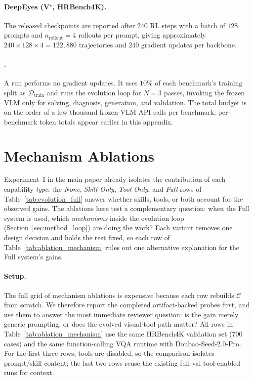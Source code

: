 \paragraph{DeepEyes (V$^\star$, HRBench4K).}
The released checkpoints are reported after $240$ RL steps with a batch of $128$ prompts
and $n_{\text{rollout}}{=}4$ rollouts per prompt, giving approximately
$240 \times 128 \times 4 = 122{,}880$ trajectories and $240$ gradient updates per backbone.

\paragraph{\sysname{}.}
A \sysname{} run performs no gradient updates. It uses $10\%$ of each benchmark's training
split as $\mathcal{D}_{\text{train}}$ and runs the evolution loop for $N{=}3$ passes,
invoking the frozen VLM only for solving, diagnosis, generation, and validation. The
total budget is on the order of a few thousand frozen-VLM API calls per benchmark;
per-benchmark token totals appear earlier in this appendix.

\section{Mechanism Ablations}
\label{app:ablation_mechanisms}

Experiment~I in the main paper already isolates the contribution of each capability
\emph{type}: the \emph{None}, \emph{Skill Only}, \emph{Tool Only}, and \emph{Full} rows of
Table~\ref{tab:evolution_full} answer whether skills, tools, or both account for the
observed gains. The ablations here test a complementary question: when the Full system is
used, which \emph{mechanisms} inside the evolution loop (Section~\ref{sec:method_loop}) are
doing the work? Each variant removes one design decision and holds the rest fixed, so each
row of Table~\ref{tab:ablation_mechanism} rules out one alternative explanation for the
Full system's gains.

\paragraph{Setup.}
The full grid of mechanism ablations is expensive because each row rebuilds
$\mathcal{C}$ from scratch. We therefore report the completed artifact-backed probes first,
and use them to answer the most immediate reviewer question: is the gain merely generic
prompting, or does the evolved visual-tool path matter? All rows in
Table~\ref{tab:ablation_mechanism} use the same HRBench4K validation set (700 cases) and the
same function-calling VQA runtime with Doubao-Seed-2.0-Pro. For the first three rows,
tools are disabled, so the comparison isolates prompt/skill content; the last two rows
reuse the existing full-val tool-enabled runs for context.

